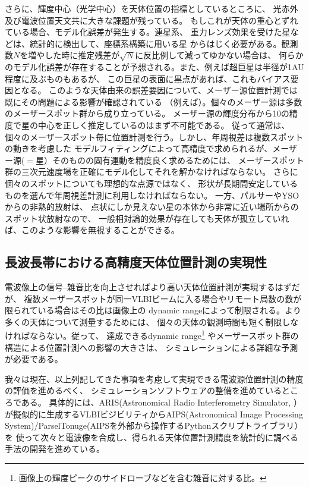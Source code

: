 さらに、輝度中心（光学中心）を天体位置の指標としているところに、
光赤外及び電波位置天文共に大きな課題が残っている。
もしこれが天体の重心とずれている場合、モデル化誤差が発生する。連星系、
重力レンズ効果を受けた星などは、統計的に検出して、座標系構築に用いる星
からはじく必要がある。観測数$N$を増やした時に推定残差が$\sqrt{N}$に反比例して減ってゆかない場合は、
何らかのモデル化誤差が存在することが予想される。また、例えば超巨星は半径が1AU程度に及ぶものもあるが、
この巨星の表面に黒点があれば、これもバイアス要因となる。
このような天体由来の誤差要因について、メーザー源位置計測では既にその問題による影響が確認されている
（例えば\citealt{2014ApJ...787...54A}）。個々のメーザー源は多数のメーザースポット群から成り立っている。
メーザー源の輝度分布から10\uas の精度で星の中心を正しく推定しているのはまず不可能である。
従って通常は、個々のメーザースポット毎に位置計測を行う。しかし、年周視差は複数スポットの動きを考慮した
モデルフィティングによって高精度で求められるが、メーザー源($=$星）そのものの固有運動を精度良く求めるためには、
メーザースポット群の三次元速度場を正確にモデル化してそれを解かなければならない。
さらに個々のスポットについても理想的な点源ではなく、
形状が長期間安定しているものを選んで年周視差計測に利用しなければならない。
一方、パルサーやYSOからの非熱的放射は、
点状にしか見えない星の本体から非常に近い場所からのスポット状放射なので、
一般相対論的効果が存在しても天体が孤立していれば、このような影響を無視することができる。

\setcounter{subsection}{3}\subsection{長波長帯における高精度天体位置計測の実現性}\label{c7.s2.ss4}
電波像上の信号--雑音比を向上させればより高い天体位置計測が実現するはずだが、
複数メーザースポットが同一VLBIビームに入る場合やリモート局数の数が限られている場合はその比は画像上の
dynamic rangeによって制限される。より多くの天体について測量するためには、
個々の天体の観測時間も短く制限しなければならない。従って、
達成できるdynamic range\footnote{画像上の輝度ピークのサイドローブなどを含む雑音に対する比。}
やメーザースポット群の構造による位置計測への影響の大きさは、
シミュレーションによる詳細な予測が必要である。

我々は現在、以上列記してきた事項を考慮して実現できる電波源位置計測の精度の評価を進めるべく、
シミュレーションソフトウェアの整備を進めているところである。
具体的には、ARIS(Astronomical Radio Interferometry Simulator, 
\citealt{2007PASJ...59..397A} ）が擬似的に生成するVLBIビジビリティからAIPS(Astronomical 
Image Processing System)/ParselTonuge(AIPSを外部から操作するPythonスクリプトライブラリ）を
使って次々と電波像を合成し、得られる天体位置計測精度を統計的に調べる手法の開発を進めている。

